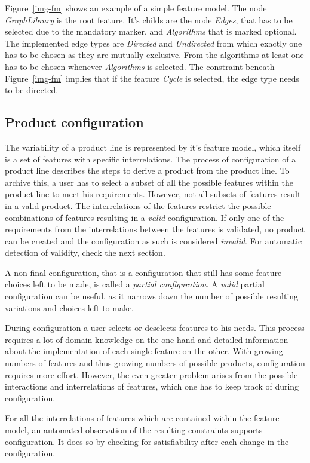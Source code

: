 Figure~\ref{img-fm} shows an example of a simple feature model. The node \textit{GraphLibrary} is the root feature. It's childs are the node \textit{Edges}, that has to be selected due to the mandatory marker, and \textit{Algorithms} that is marked optional. The implemented edge types are \textit{Directed} and \textit{Undirected} from which exactly one has to be chosen as they are mutually exclusive. From the algorithms at least one has to be chosen whenever \textit{Algorithms} is selected. The constraint beneath Figure~\ref{img-fm} implies that if the feature \textit{Cycle} is selected, the edge type needs to be directed.


\subsection{Product configuration}
The variability of a product line is represented by it's feature model, which itself is a set of features with specific interrelations. The process of configuration of a product line describes the steps to derive a product from the product line. To archive this, a user has to select a subset of all the possible features within the product line to meet his requirements. However, not all subsets of features result in a valid product. The interrelations of the features restrict the possible combinations of features resulting in a \textit{valid} configuration. If only one of the requirements from the interrelations between the features is validated, no product can be created and the configuration as such is considered \textit{invalid}. For automatic detection of validity, check the next section.

A non-final configuration, that is a configuration that still has some feature choices left to be made, is called a \textit{partial configuration}. A \textit{valid} partial configuration can be useful, as it narrows down the number of possible resulting variations and choices left to make.

During configuration a user selects or deselects features to his needs. This process requires a lot of domain knowledge on the one hand and detailed information about the implementation of each single feature on the other. With growing numbers of features and thus growing numbers of possible products, configuration requires more effort. However, the even greater problem arises from the possible interactions and interrelations of features, which one has to keep track of during configuration.

For all the interrelations of features which are contained within the feature model, an automated observation of the resulting constraints supports configuration. It does so by checking for satisfiability after each change in the configuration.


